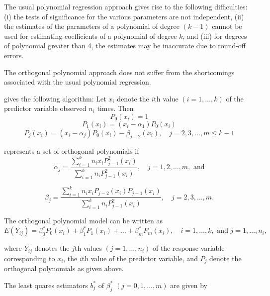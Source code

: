 The usual polynomial regression approach gives rise to the following difficulties: (i) the tests of significance for the various parameters are not independent, (ii) the estimates of the parameters of a polynomial of degree $(k-1)$ cannot be used for estimating coefficients of a polynomial of degree $k$, and (iii) for degrees of polynomial greater than 4, the estimates may be inaccurate due to round-off errors.


The orthogonal polynomial approach does not suffer from the shortcomings associated with the usual polynomial regression.

\cite{Narula_1978} gives the following algorithm: Let $x_i$  denote the $i$th value $(i=1,\ldots,k)$  of the predictor variable observed $n_i$  times. Then
\begin{equation}
	P_0(x_i)=1
\end{equation}
\begin{equation}
	P_1(x_i)=(x_i- \alpha_1)P_0(x_i)
\end{equation}
\begin{equation}
	P_j(x_i)=(x_i- \alpha_j)P_0(x_i) - \beta_{j-2}(x_i), \quad j=2,3,\ldots,m\leq k-1
\end{equation}

represents a set of orthogonal polynomials if
\begin{equation}
	\alpha_j = \frac{\sum_{i=1}^k n_i x_i P_{j-1}^2(x_i) }{\sum_{i=1}^k n_i P_{j-1}^2(x_i) }, \quad j=1,2,\ldots,m, \text{ and}
\end{equation}

\begin{equation}
	\beta_j = \frac{\sum_{i=1}^k n_i x_i P_{j-2}(x_i) P_{j-1}(x_i)}{\sum_{i=1}^k n_i P_{j-1}^2(x_i) }, \quad j=2,3,\ldots,m.
\end{equation}

The orthogonal polynomial model can  be written as
\begin{equation}
	E(Y_{ij}) = \beta_0^* P_0(x_i) + \beta_1^* P_1(x_i) + \ldots + \beta_m^* P_m(x_i), \quad i=1,\ldots,k, \text{ and } j=1,\ldots,n_i,
\end{equation}

where  $Y_{ij}$ denotes the  $j$th values $(j=1,\ldots,n_i)$  of the response variable corresponding to $x_i$, the  $i$th value of the predictor variable, and  $P_j$ denote the orthogonal polynomials as given above.

The least quares estimators $b_j^*$ of $\beta_j^*$ $(j=0,1,\ldots,m)$  are given by

